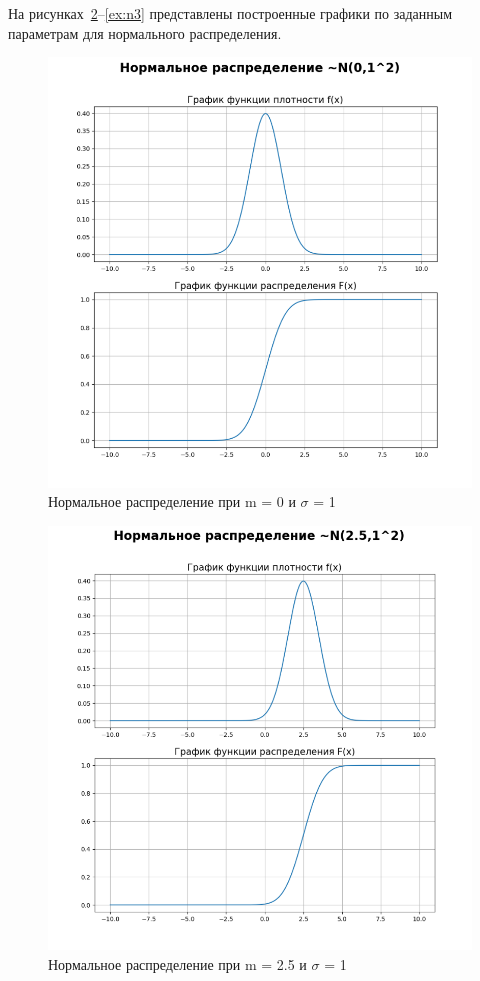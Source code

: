 \clearpage

На рисунках~\ref{ex:n2}--\ref{ex:n3} представлены построенные графики по заданным параметрам для нормального распределения.

\begin{figure}[ht!]
	\centering
	\includegraphics[width=0.8\linewidth]{img/n1.png}
	\caption{Нормальное распределение при m = 0 и $\sigma$ = 1}
	\label{ex:n1}
\end{figure}

\clearpage

\begin{figure}[ht!]
	\centering
	\includegraphics[width=0.8\linewidth]{img/n2.png}
	\caption{Нормальное распределение при m = 2.5 и $\sigma$ = 1}
	\label{ex:n2}
\end{figure}

